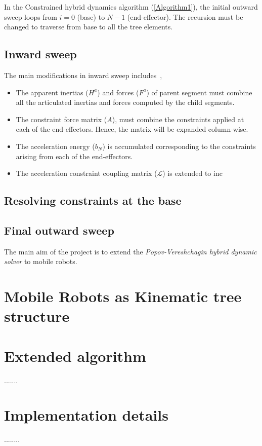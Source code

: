 In the Constrained hybrid dynamics algorithm (\ref{Algorithm1}), the initial outward sweep loops from $i=0$ (base) to $N-1$ (end-effector). The recursion must be changed to traverse from base to all the tree elements.

\subsection{Inward sweep}
The main modifications in inward sweep includes~\cite{shakhimardanov2015composable},
\begin{itemize}
	\item The apparent inertias ($H^a$) and forces ($F^a$) of parent segment must combine all the articulated inertias and forces computed by the child segments.
	\item The constraint force matrix ($A$), must combine the constraints applied at each of the end-effectors. Hence, the matrix will be expanded column-wise.
	\item The acceleration energy ($b_N$) is accumulated corresponding to the constraints arising from each of the end-effectors. 
	\item The acceleration constraint coupling matrix ($\mathcal{L}$) is extended to inc
\end{itemize}

\subsection{Resolving constraints at the base}


\subsection{Final outward sweep}

The main aim of the project is to extend the \textit{Popov-Vereshchagin hybrid dynamic solver} to mobile robots. 

\section{Mobile Robots as Kinematic tree structure}

\section{Extended algorithm}{.......}


\section{Implementation details}{........}

